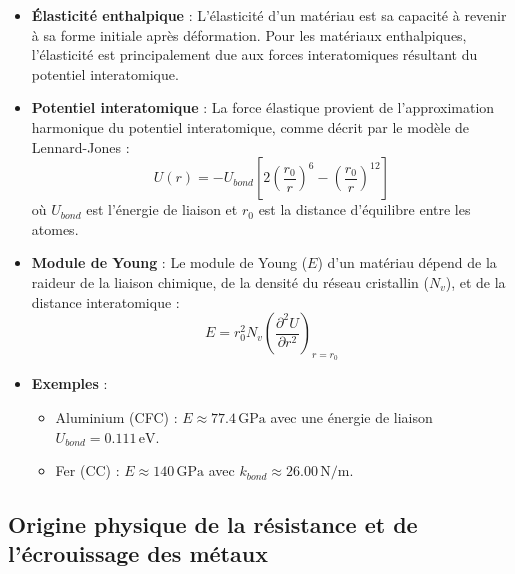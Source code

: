 \documentclass{article}
\begin{document}
    \begin{itemize}
        \item \textbf{Élasticité enthalpique} : L'élasticité d'un matériau est sa capacité à revenir à sa forme initiale après déformation. Pour les matériaux enthalpiques, l'élasticité est principalement due aux forces interatomiques résultant du potentiel interatomique.
        \item \textbf{Potentiel interatomique} : La force élastique provient de l'approximation harmonique du potentiel interatomique, comme décrit par le modèle de Lennard-Jones :
        \[
        U(r) = -U_{bond} \left[ 2 \left( \frac{r_0}{r} \right)^6 - \left( \frac{r_0}{r} \right)^{12} \right]
        \]
        où $U_{bond}$ est l'énergie de liaison et $r_0$ est la distance d'équilibre entre les atomes.
        \item \textbf{Module de Young} : Le module de Young ($E$) d'un matériau dépend de la raideur de la liaison chimique, de la densité du réseau cristallin ($N_v$), et de la distance interatomique :
        \[
        E = r_0^2 N_v \left( \frac{\partial^2 U}{\partial r^2} \right)_{r = r_0}
        \]
        \item \textbf{Exemples} : 
        \begin{itemize}
            \item Aluminium (CFC) : $E \approx 77.4 \, \text{GPa}$ avec une énergie de liaison $U_{bond} = 0.111 \, \text{eV}$.
            \item Fer (CC) : $E \approx 140 \, \text{GPa}$ avec $k_{bond} \approx 26.00 \, \text{N/m}$.
        \end{itemize}
    \end{itemize}
    
    \subsection{Origine physique de la résistance et de l’écrouissage des métaux}
    
\end{document}
